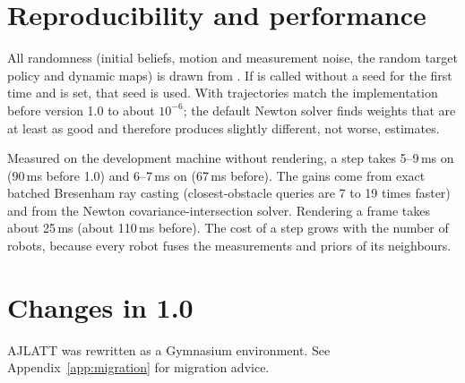 \section{Reproducibility and performance}\label{sec:ajlatt-perf}

All randomness (initial beliefs, motion and measurement noise, the random target
policy and dynamic maps) is drawn from . If
 is called without a seed for the first time and
 is set, that seed is used. With
 trajectories match the implementation before
version 1.0 to about $10^{-6}$; the default Newton solver finds weights that
are at least as good and therefore produces slightly different, not worse,
estimates.

Measured on the development machine without rendering, a step takes 5--9\,ms on
 (90\,ms before 1.0) and 6--7\,ms on 
(67\,ms before). The gains come from exact batched Bresenham ray casting
(closest-obstacle queries are 7 to 19 times faster) and from the Newton
covariance-intersection solver. Rendering a frame takes about 25\,ms (about
110\,ms before). The cost of a step grows with the number of robots, because
every robot fuses the measurements and priors of its neighbours.

\section{Changes in 1.0}\label{sec:ajlatt-changes}

AJLATT was rewritten as a Gymnasium environment. See Appendix~\ref{app:migration}
for migration advice.

